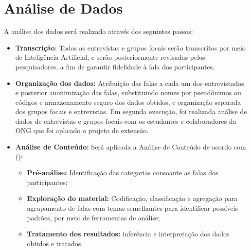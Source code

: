 \section{Análise de Dados}
\label{analisededados}

A análise dos dados será realizado através dos seguintes passos:

\begin{itemize}
    \item \textbf{Transcrição}: Todas as entrevistas e grupos focais serão transcritos por meio de Inteligência Artificial, e serão posteriormente revisadas pelos pesquisadores, a fim de garantir fidelidade à fala dos participantes.
    \item \textbf{Organização dos dados:} Atribuição das falas a cada um dos entrevistados e posterior anonimização das falas, substituindo nomes por pseudônimos ou códigos e armazenamento seguro dos dados obtidos, e organização separada dos grupos focais e entrevistas. Em segunda execução, foi realizada análise de dados de entrevistas e grupos focais com os estudantes e colaboradores da ONG que foi aplicado o projeto de extensão. 
    \item \textbf{Análise de Conteúdo:} Será aplicada a Análise de Conteúdo de acordo com \citeauthor{bardin2011} (\citeyear{bardin2011}):
	\begin{itemize}
	    \item \textbf{Pré-análise:} Identificação das categorias consoante as falas dos participantes;
	\item \textbf{Exploração do material:} Codificação, classificação e agregação para agrupamento de falas com temas semelhantes para identificar possíveis padrões, por meio de ferramentas de análise;
	\item \textbf{Tratamento dos resultados:} inferência e interpretação dos dados obtidos e tratados.
	\end{itemize}


\end{itemize}